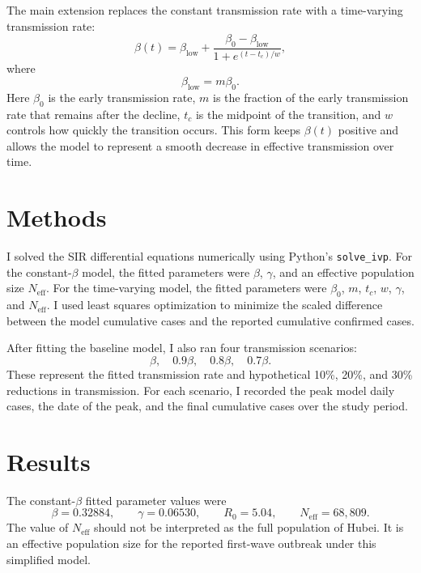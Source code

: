 \documentclass[11pt]{article}
\begin{document}
The main extension replaces the constant transmission rate with a time-varying transmission rate:
\begin{equation}
    \beta(t) = \beta_{\mathrm{low}} + \frac{\beta_0 - \beta_{\mathrm{low}}}{1 + e^{(t-t_c)/w}},
\end{equation}
where
\begin{equation}
    \beta_{\mathrm{low}} = m\beta_0.
\end{equation}
Here $\beta_0$ is the early transmission rate, $m$ is the fraction of the early transmission rate that remains after the decline, $t_c$ is the midpoint of the transition, and $w$ controls how quickly the transition occurs. This form keeps $\beta(t)$ positive and allows the model to represent a smooth decrease in effective transmission over time.

\section{Methods}

I solved the SIR differential equations numerically using Python's \texttt{solve\_ivp}. For the constant-$\beta$ model, the fitted parameters were $\beta$, $\gamma$, and an effective population size $N_{\mathrm{eff}}$. For the time-varying model, the fitted parameters were $\beta_0$, $m$, $t_c$, $w$, $\gamma$, and $N_{\mathrm{eff}}$. I used least squares optimization to minimize the scaled difference between the model cumulative cases and the reported cumulative confirmed cases.

After fitting the baseline model, I also ran four transmission scenarios:
\[
    \beta,\quad 0.9\beta,\quad 0.8\beta,\quad 0.7\beta.
\]
These represent the fitted transmission rate and hypothetical 10\%, 20\%, and 30\% reductions in transmission. For each scenario, I recorded the peak model daily cases, the date of the peak, and the final cumulative cases over the study period.

\section{Results}

The constant-$\beta$ fitted parameter values were
\[
    \beta = 0.32884,\qquad
    \gamma = 0.06530,\qquad
    R_0 = 5.04,\qquad
    N_{\mathrm{eff}} = 68{,}809.
\]
The value of $N_{\mathrm{eff}}$ should not be interpreted as the full population of Hubei. It is an effective population size for the reported first-wave outbreak under this simplified model.
\end{document}
